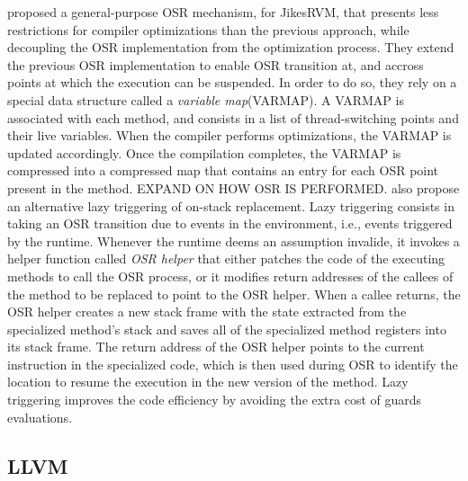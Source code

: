 proposed a general-purpose OSR mechanism, for JikesRVM, that presents less restrictions for compiler optimizations than the previous approach, while decoupling the OSR implementation from the optimization process.
They extend the previous OSR implementation\cite{fink2003design} to enable OSR transition at, and accross points at which the execution can be suspended.
In order to do so, they rely on a special data structure called a \textit{variable map}(VARMAP).
A VARMAP is associated with each method, and consists in a list of thread-switching points and their live variables.
When the compiler performs optimizations, the VARMAP is updated accordingly.
Once the compilation completes, the VARMAP is compressed into a compressed map that contains an entry for each OSR point present in the method. EXPAND ON HOW OSR IS PERFORMED.
 also propose an alternative lazy triggering of on-stack replacement.
Lazy triggering consists in taking an OSR transition due to events in the environment, i.e., events triggered by the runtime. 
Whenever the runtime deems an assumption invalide, it invokes a helper function called \textit{OSR helper} that either patches the code of the executing methods to call the OSR process, or it modifies return addresses of the callees of the method to be replaced to point to the OSR helper.
When a callee returns, the OSR helper creates a new stack frame with the state extracted from the specialized method's stack and saves all of the specialized method registers into its stack frame. 
The return address of the OSR helper points to the current instruction in the specialized code, which is then used during OSR to identify the location to resume the execution in the new version of the method.
Lazy triggering improves the code efficiency by avoiding the extra cost of guards evaluations.  



\subsection{LLVM}

